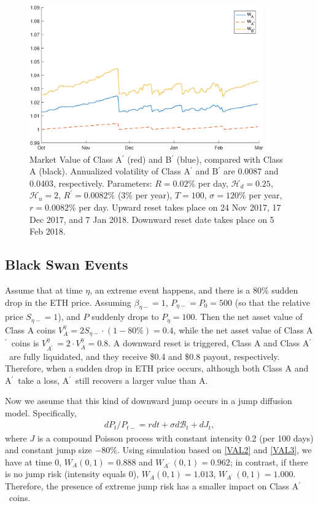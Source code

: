 \documentclass[draft, noinfoline]{ectaart}
\numberwithin{equation}{section}
\theoremstyle{plain}
\newcommand{\Ap}{A\ensuremath{^\prime}~}
\begin{document}
\begin{figure}[!htb]
\centering
\includegraphics[width=0.9\textwidth]{WABpnoCI4.eps}
\caption{Market Value of Class A$^\prime$ (red) and B$^\prime$ (blue), compared with Class A (black). Annualized volatility of Class A$^\prime$ and B$^\prime$ are 0.0087 and 0.0403, respectively. Parameters: $R=0.02\%$ per day, $\mathcal{H}_{d}=0.25$, $\mathcal{H}_{u} =2$, $R^\prime = 0.0082\%$ ($3\%$ per year), $T=100$, $\sigma= 120\%$ per year, $r=0.0082\%$ per day. Upward reset takes place on 24 Nov 2017, 17 Dec 2017, and 7 Jan 2018. Downward reset date takes place on 5 Feb 2018.}
\label{fig:valAPrime}
\end{figure}



\subsection{Black Swan Events}
Assume that at time $\eta$, an extreme event happens, and there is a 80\% sudden drop in the ETH price. Assuming $\beta_{\eta-} = 1$, $P_{\eta-} = P_0 = 500$ (so that the relative price $S_{\eta−} = 1$), and $P$ suddenly drops to $P_\eta = 100$. Then the net asset value of Class A coins $V_A^\eta = 2S_{\eta-} \cdot(1-80\%) = 0.4$, while the net asset value of Class \Ap coins is $V^\eta_{\Ap} = 2 \cdot V^\eta_A = 0.8$. A downward reset is triggered, Class A and Class \Ap are fully liquidated, and they receive \$0.4 and \$0.8 payout, respectively. Therefore, when a sudden drop in ETH price occurs, although both Class A and \Ap take a loss, \Ap still recovers a larger value than A.

Now we assume that this kind of downward jump occurs in a jump diffusion model. Specifically,
\begin{align*}
dP_{t}/P_{t-}=r dt+\sigma d\mathcal{B}_{t}+ dJ_t,
\end{align*}
where $J$ is a compound Poisson process with constant intensity 0.2 (per 100 days) and constant jump size $-80\%$. Using simulation based on \eqref{VAL2} and \eqref{VAL3}, we have at time 0, $W_A(0,1) = 0.888$ and $W_{\Ap} (0,1) = 0.962$; in contrast, if there is no jump risk (intensity equals 0), $W_A(0,1) = 1.013$, $W_{\Ap} (0,1) = 1.000$. Therefore, the presence of extreme jump risk has a smaller impact on Class \Ap coins.
\end{document}
